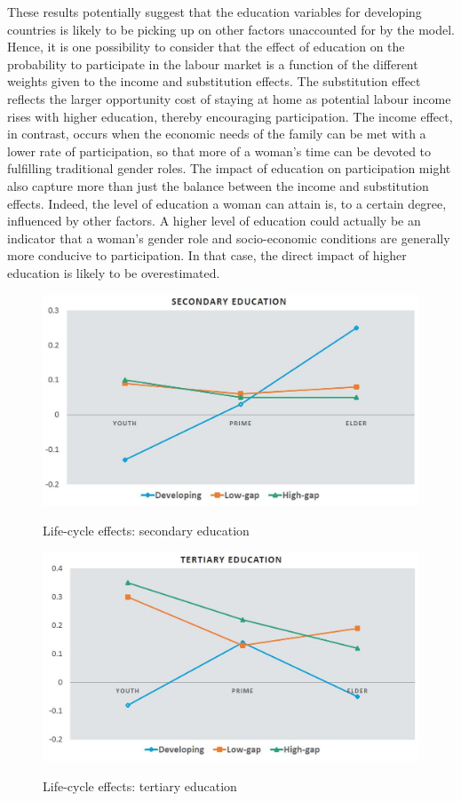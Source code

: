 These results potentially suggest that the education variables for developing countries is likely to be picking up on other factors unaccounted for by the model. Hence, it is one possibility to consider that the effect of education on the probability to participate in the labour market is a function of the different weights given to the income and substitution effects. The substitution effect reflects the larger opportunity cost of staying at home as potential labour income rises with higher education, thereby encouraging participation. The income effect, in contrast, occurs when the economic needs of the family can be met with a lower rate of participation, so that more of a woman's time can be devoted to fulfilling traditional gender roles. The impact of education on participation might also capture more than just the balance between the income and substitution effects. Indeed, the level of education a woman can attain is, to a certain degree, influenced by other factors. A higher level of education could actually be an indicator that a woman's gender role and socio-economic conditions are generally more conducive to participation. In that case, the direct impact of higher education is likely to be overestimated.

\begin{figure}[htb]
	\centering
	\caption{Life-cycle effects: secondary education}
	\includegraphics[width=120mm,keepaspectratio,height=0.6\textheight]{Figures/education}
	\label{fig:education}
\end{figure}

\begin{figure}[htb]
	\centering
	\caption{Life-cycle effects: tertiary education}
	\includegraphics[width=120mm,keepaspectratio,height=0.6\textheight]{Figures/education_2}
	\label{fig:education2}
\end{figure}



